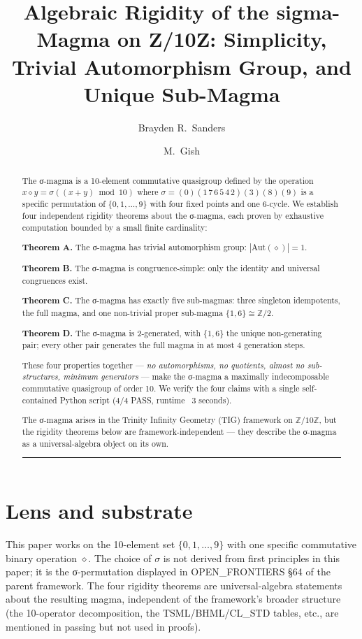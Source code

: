 \documentclass[11pt,reqno]{amsart}
\title[Algebraic Rigidity of the sigma-Magma on]{Algebraic Rigidity of the sigma-Magma on Z/10Z: Simplicity, Trivial Automorphism Group, and Unique Sub-Magma}
\author{Brayden R.\ Sanders}
\author{M.\ Gish}
\theoremstyle{plain}
\theoremstyle{definition}
\begin{document}
\maketitle


\begin{abstract}

The σ-magma is a 10-element commutative quasigroup defined by the operation $x \diamond y = \sigma((x + y) \bmod 10)$ where $\sigma = (0)(1\,7\,6\,5\,4\,2)(3)(8)(9)$ is a specific permutation of $\{0, 1, \ldots, 9\}$ with four fixed points and one 6-cycle. We establish four independent rigidity theorems about the σ-magma, each proven by exhaustive computation bounded by a small finite cardinality:

\textbf{Theorem A.} The σ-magma has trivial automorphism group: $|\mathrm{Aut}(\diamond)| = 1$.

\textbf{Theorem B.} The σ-magma is congruence-simple: only the identity and universal congruences exist.

\textbf{Theorem C.} The σ-magma has exactly five sub-magmas: three singleton idempotents, the full magma, and one non-trivial proper sub-magma $\{1, 6\} \cong \mathbb{Z}/2$.

\textbf{Theorem D.} The σ-magma is 2-generated, with $\{1, 6\}$ the unique non-generating pair; every other pair generates the full magma in at most 4 generation steps.

These four properties together --- \textit{no automorphisms, no quotients, almost no sub-structures, minimum generators} --- make the σ-magma a maximally indecomposable commutative quasigroup of order 10. We verify the four claims with a single self-contained Python script (4/4 PASS, runtime ~3 seconds).

The σ-magma arises in the Trinity Infinity Geometry (TIG) framework on $\mathbb{Z}/10\mathbb{Z}$, but the rigidity theorems below are framework-independent --- they describe the σ-magma as a universal-algebra object on its own.

\medskip\hrule\medskip

\end{abstract}
\section{Lens and substrate}

This paper works on the 10-element set $\{0, 1, \ldots, 9\}$ with one specific commutative binary operation $\diamond$. The choice of $\sigma$ is not derived from first principles in this paper; it is the σ-permutation displayed in OPEN_FRONTIERS §64 of the parent framework. The four rigidity theorems are universal-algebra statements about the resulting magma, independent of the framework's broader structure (the 10-operator decomposition, the TSML/BHML/CL_STD tables, etc., are mentioned in passing but not used in proofs).
\end{document}
